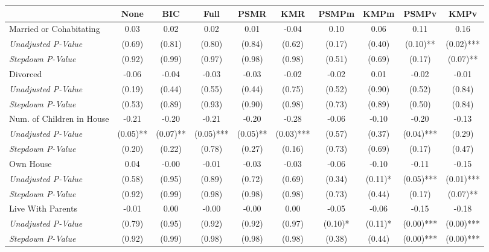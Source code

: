 \begin{tabular}{l c c c c c c c c c}
\toprule
 & None & BIC & Full & PSMR & KMR & PSMPm & KMPm & PSMPv & KMPv \\
\midrule
Married or Cohabitating & 0.03 & 0.02 & 0.02 & 0.01 & -0.04 & 0.10 & 0.06 & 0.11 & 0.16 \\
\quad \textit{Unadjusted P-Value} & (0.69) & (0.81) & (0.80) & (0.84) & (0.62) & (0.17) & (0.40) & (0.10)** & (0.02)*** \\
\quad \textit{Stepdown P-Value} & (0.92) & (0.99) & (0.97) & (0.98) & (0.98) & (0.51) & (0.69) & (0.17) & (0.07)** \\
Divorced & -0.06 & -0.04 & -0.03 & -0.03 & -0.02 & -0.02 & 0.01 & -0.02 & -0.01 \\
\quad \textit{Unadjusted P-Value} & (0.19) & (0.44) & (0.55) & (0.44) & (0.75) & (0.52) & (0.90) & (0.52) & (0.84) \\
\quad \textit{Stepdown P-Value} & (0.53) & (0.89) & (0.93) & (0.90) & (0.98) & (0.73) & (0.89) & (0.50) & (0.84) \\
Num. of Children in House & -0.21 & -0.20 & -0.21 & -0.20 & -0.28 & -0.06 & -0.10 & -0.20 & -0.13 \\
\quad \textit{Unadjusted P-Value} & (0.05)** & (0.07)** & (0.05)*** & (0.05)** & (0.03)*** & (0.57) & (0.37) & (0.04)*** & (0.29) \\
\quad \textit{Stepdown P-Value} & (0.20) & (0.22) & (0.78) & (0.27) & (0.16) & (0.73) & (0.69) & (0.17) & (0.47) \\
Own House & 0.04 & -0.00 & -0.01 & -0.03 & -0.03 & -0.06 & -0.10 & -0.11 & -0.15 \\
\quad \textit{Unadjusted P-Value} & (0.58) & (0.95) & (0.89) & (0.72) & (0.69) & (0.34) & (0.11)* & (0.05)*** & (0.01)*** \\
\quad \textit{Stepdown P-Value} & (0.92) & (0.99) & (0.98) & (0.98) & (0.98) & (0.73) & (0.44) & (0.17) & (0.07)** \\
Live With Parents & -0.01 & 0.00 & -0.00 & -0.00 & 0.00 & -0.05 & -0.06 & -0.15 & -0.18 \\
\quad \textit{Unadjusted P-Value} & (0.79) & (0.95) & (0.92) & (0.92) & (0.97) & (0.10)* & (0.11)* & (0.00)*** & (0.00)*** \\
\quad \textit{Stepdown P-Value} & (0.92) & (0.99) & (0.98) & (0.98) & (0.98) & (0.38) & (0.44) & (0.00)*** & (0.00)*** \\
\bottomrule
\end{tabular}

